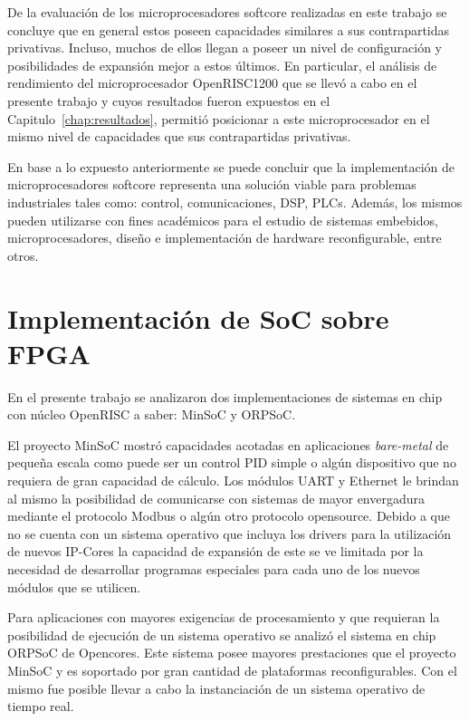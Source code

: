 De la evaluación de los microprocesadores softcore realizadas en este trabajo se concluye que en general estos poseen capacidades similares a sus
contrapartidas privativas. Incluso, muchos de ellos llegan a poseer un nivel de configuración y posibilidades de expansión mejor a estos últimos.
En particular, el análisis de rendimiento del microprocesador OpenRISC1200 que se llevó a cabo en el presente trabajo y cuyos resultados fueron
expuestos en el Capitulo~\ref {chap:resultados}, permitió posicionar a este microprocesador en el mismo nivel de capacidades que sus contrapartidas
privativas.

En base a lo expuesto anteriormente se puede concluir que la implementación de microprocesadores softcore representa una solución viable para
problemas industriales tales como: control, comunicaciones, DSP, PLCs. Además, los mismos pueden utilizarse con fines académicos para el estudio de
sistemas embebidos, microprocesadores, diseño e implementación de hardware reconfigurable, entre otros.

\section{Implementación de SoC sobre FPGA}

En el presente trabajo se analizaron dos implementaciones de sistemas en chip con núcleo OpenRISC a saber: MinSoC y ORPSoC.

El proyecto MinSoC mostró capacidades acotadas en aplicaciones \textit{bare-metal} de pequeña escala como puede ser un control PID simple o algún
dispositivo que no requiera de gran capacidad de cálculo. Los módulos UART y Ethernet le brindan al mismo la posibilidad de comunicarse con sistemas
de mayor envergadura mediante el protocolo Modbus o algún otro protocolo opensource. Debido a que no se cuenta con un sistema operativo que incluya
los drivers para la utilización de nuevos IP-Cores la capacidad de expansión de este se ve limitada por la necesidad de desarrollar programas
especiales para cada uno de los nuevos módulos que se utilicen.

Para aplicaciones con mayores exigencias de procesamiento y que requieran la posibilidad de ejecución de un sistema operativo se analizó el sistema
en chip ORPSoC de Opencores. Este sistema posee mayores prestaciones que el proyecto MinSoC y es soportado por gran cantidad de plataformas
reconfigurables. Con el mismo fue posible llevar a cabo la instanciación de un sistema operativo de tiempo real.
 
